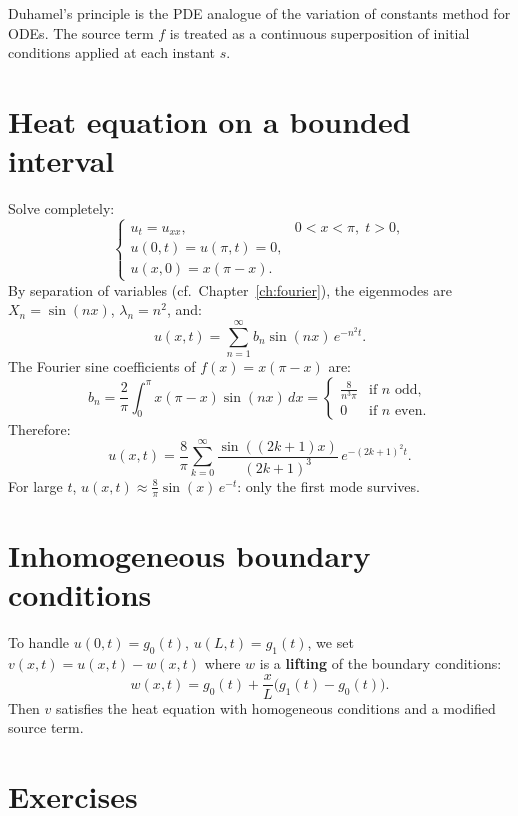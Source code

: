 \begin{intuition}
Duhamel's principle is the PDE analogue of the variation of constants
method for ODEs. The source term $f$ is treated as a continuous
superposition of initial conditions applied at each instant $s$.
\end{intuition}

\section{Heat equation on a bounded interval}

\begin{example}
Solve completely:
\[
    \begin{cases}
        u_t = u_{xx}, & 0 < x < \pi,\; t > 0,\\
        u(0,t) = u(\pi,t) = 0,\\
        u(x,0) = x(\pi - x).
    \end{cases}
\]
By separation of variables (cf.\ Chapter~\ref{ch:fourier}), the eigenmodes
are $X_n = \sin(nx)$, $\lambda_n = n^2$, and:
\[
    u(x,t) = \sum_{n=1}^{\infty} b_n \sin(nx)\, e^{-n^2 t}.
\]
The Fourier sine coefficients of $f(x) = x(\pi-x)$ are:
\[
    b_n = \frac{2}{\pi}\int_0^\pi x(\pi-x)\sin(nx)\, dx
    = \begin{cases} \frac{8}{n^3\pi} & \text{if $n$ odd,}\\ 0 & \text{if $n$ even.}\end{cases}
\]
Therefore:
\[
    u(x,t) = \frac{8}{\pi}\sum_{k=0}^{\infty}
    \frac{\sin((2k+1)x)}{(2k+1)^3}\, e^{-(2k+1)^2 t}.
\]
For large $t$, $u(x,t) \approx \frac{8}{\pi}\sin(x)\, e^{-t}$:
only the first mode survives.
\end{example}

\section{Inhomogeneous boundary conditions}

To handle $u(0,t) = g_0(t)$, $u(L,t) = g_1(t)$, we set
$v(x,t) = u(x,t) - w(x,t)$ where $w$ is a \textbf{lifting} of the
boundary conditions:
\[
    w(x,t) = g_0(t) + \frac{x}{L}\bigl(g_1(t) - g_0(t)\bigr).
\]
Then $v$ satisfies the heat equation with homogeneous conditions and a
modified source term.

\section{Exercises}

